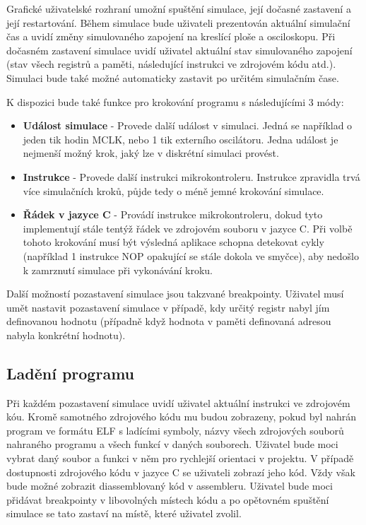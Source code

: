 Grafické uživatelské rozhraní umožní spuštění simulace, její dočasné zastavení a její restartování. Během simulace bude uživateli prezentován aktuální simulační čas a uvidí změny simulovaného zapojení na kreslící ploše a osciloskopu. Při dočasném zastavení simulace uvidí uživatel aktuální
stav simulovaného zapojení (stav všech registrů a paměti, následující instrukci ve zdrojovém kódu atd.). Simulaci bude také možné automaticky zastavit po určitém simulačním čase.

K dispozici bude také funkce pro krokování programu s následujícími 3 módy:

\begin{itemize}
\item \textbf{Událost simulace} - Provede další událost v simulaci. Jedná se například o jeden tik hodin MCLK, nebo 1 tik externího oscilátoru. Jedna událost je nejmenší možný krok, jaký lze v diskrétní simulaci provést.
\item \textbf{Instrukce} - Provede další instrukci mikrokontroleru. Instrukce zpravidla trvá více simulačních kroků, půjde tedy o méně jemné krokování simulace.
\item \textbf{Řádek v jazyce C} - Provádí instrukce mikrokontroleru, dokud tyto implementují stále tentýž řádek ve zdrojovém souboru v jazyce C. Při volbě tohoto krokování musí být výsledná aplikace schopna detekovat cykly (například 1 instrukce NOP opakující se stále dokola ve smyčce), aby nedošlo k zamrznutí simulace při vykonávání kroku.
\end{itemize}

Další možností pozastavení simulace jsou takzvané breakpointy. Uživatel musí umět nastavit pozastavení simulace v případě, kdy určitý registr nabyl jím definovanou hodnotu (případně když hodnota v paměti definovaná adresou nabyla konkrétní hodnotu).

\subsection{Ladění programu}

Při každém pozastavení simulace uvidí uživatel aktuální instrukci ve zdrojovém kóu. Kromě samotného zdrojového kódu mu budou zobrazeny, pokud byl nahrán program ve formátu ELF s ladícími symboly, názvy všech zdrojových souborů nahraného programu a všech funkcí v daných souborech. Uživatel bude moci vybrat daný soubor a funkci v něm pro rychlejší orientaci v projektu. V případě dostupnosti zdrojového kódu v jazyce C se uživateli zobrazí jeho kód. Vždy však bude možné zobrazit diassemblovaný kód v assembleru. Uživatel bude moci přidávat breakpointy v libovolných místech kódu a po opětovném spuštění simulace se tato zastaví na místě, které uživatel zvolil.

